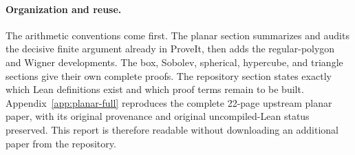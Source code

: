 \documentclass[11pt,a4paper]{article}
\theoremstyle{definition}
\begin{document}
\paragraph{Organization and reuse.}
The arithmetic conventions come first. The planar section summarizes and
audits the decisive finite argument already in ProveIt, then adds the
regular-polygon and Wigner developments. The box, Sobolev, spherical,
hypercube, and triangle sections give their own complete proofs. The
repository section states exactly which Lean definitions exist and which
proof terms remain to be built. Appendix~\ref{app:planar-full} reproduces
the complete 22-page upstream planar paper, with its original provenance
and original uncompiled-Lean status preserved. This report is therefore
readable without downloading an additional paper from the repository.









\end{document}
